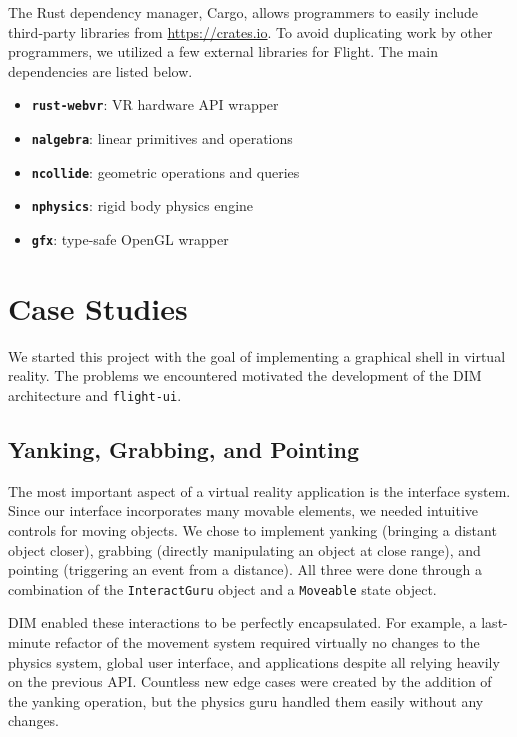 \documentclass[conference,12pt]{IEEEtran}
\begin{document}
The Rust dependency manager, Cargo, allows programmers to easily include
third-party libraries from \url{https://crates.io}. To avoid duplicating work
by other programmers, we utilized a few external libraries for Flight. The main
dependencies are listed below.
\begin{itemize}
    \item \textbf{\texttt{rust-webvr}}: VR hardware API wrapper
    \item \textbf{\texttt{nalgebra}}: linear primitives and operations
    \item \textbf{\texttt{ncollide}}: geometric operations and queries
    \item \textbf{\texttt{nphysics}}: rigid body physics engine
    \item \textbf{\texttt{gfx}}: type-safe OpenGL wrapper
\end{itemize}

\section{Case Studies}\label{sec:case-studies}

We started this project with the goal of implementing a graphical shell in
virtual reality. The problems we encountered motivated the development of the
DIM architecture and \texttt{flight-ui}.

\subsection{Yanking, Grabbing, and Pointing}

The most important aspect of a virtual reality application is the interface
system. Since our interface incorporates many movable elements, we needed
intuitive controls for moving objects. We chose to implement yanking (bringing a
distant object closer), grabbing (directly manipulating an object at close
range), and pointing (triggering an event from a distance). All three were done
through a combination of the \texttt{InteractGuru} object and a
\texttt{Moveable} state object.

DIM enabled these interactions to be perfectly encapsulated. For example, a
last-minute refactor of the movement system required virtually no changes to the
physics system, global user interface, and applications despite all relying
heavily on the previous API. Countless new edge cases were created by the
addition of the yanking operation, but the physics guru handled them easily
without any changes.
\end{document}
